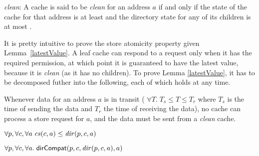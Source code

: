 \vspace{-.15in}

\begin{defn}
\textit{clean}: A cache is said to be \textit{clean} for an address $a$ if and only if
the state of the cache for that address is at least \Sh{} and the directory 
state for any of its children is at most \Sh.
\label{clean}
\end{defn}

It is pretty intuitive to prove the store atomicity property given
Lemma~\ref{latestValue}. A leaf cache can respond to a request only when it
has the required permission, at which point it is guaranteed to have the latest
value, because it is \textit{clean} (as it has no children). To prove Lemma
\ref{latestValue}, it has to be decomposed futher into the following, each of
which holds at any time.


\begin{lemma}[noTransitWrite] Whenever data for an address $a$ is in transit (\ie{}
$\forall T. \; T_s \le T \le T_r$ where $T_s$ is the time of sending the data and
$T_r$ the time of receiving the data), no cache can process a store request for
$a$, and the data must be sent from a \textit{clean} cache.
\label{noTransitWrite}
\end{lemma}

\begin{lemma}%
$\forall p, \forall c, \forall a\;\mathit{cs}(c, a) \le \mathit{dir}(p, c, a)$
\label{conservative}
\end{lemma}

\begin{lemma}%
$\forall p, \forall c, \forall a.\; \mathsf{dirCompat}(p, c, \mathit{dir}(p,c,a), a)$
\end{lemma}

